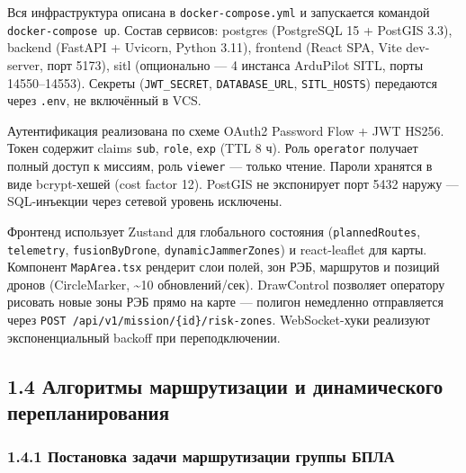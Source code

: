 \documentclass[14pt,a4paper]{extarticle}
\begin{document}
Вся инфраструктура описана в \texttt{docker-compose.yml} и запускается командой \texttt{docker-compose\ up}. Состав сервисов: postgres (PostgreSQL 15 + PostGIS 3.3), backend (FastAPI + Uvicorn, Python 3.11), frontend (React SPA, Vite dev-server, порт 5173), sitl (опционально --- 4 инстанса ArduPilot SITL, порты 14550--14553). Секреты (\texttt{JWT\_SECRET}, \texttt{DATABASE\_URL}, \texttt{SITL\_HOSTS}) передаются через \texttt{.env}, не включённый в VCS.

Аутентификация реализована по схеме OAuth2 Password Flow + JWT HS256. Токен содержит claims \texttt{sub}, \texttt{role}, \texttt{exp} (TTL 8 ч). Роль \texttt{operator} получает полный доступ к миссиям, роль \texttt{viewer} --- только чтение. Пароли хранятся в виде bcrypt-хешей (cost factor 12). PostGIS не экспонирует порт 5432 наружу --- SQL-инъекции через сетевой уровень исключены.

Фронтенд использует Zustand для глобального состояния (\texttt{plannedRoutes}, \texttt{telemetry}, \texttt{fusionByDrone}, \texttt{dynamicJammerZones}) и react-leaflet для карты. Компонент \texttt{MapArea.tsx} рендерит слои полей, зон РЭБ, маршрутов и позиций дронов (CircleMarker, \textasciitilde10 обновлений/сек). DrawControl позволяет оператору рисовать новые зоны РЭБ прямо на карте --- полигон немедленно отправляется через \texttt{POST\ /api/v1/mission/\{id\}/risk-zones}. WebSocket-хуки реализуют экспоненциальный backoff при переподключении.


\hypertarget{ux430ux43bux433ux43eux440ux438ux442ux43cux44b-ux43cux430ux440ux448ux440ux443ux442ux438ux437ux430ux446ux438ux438-ux438-ux434ux438ux43dux430ux43cux438ux447ux435ux441ux43aux43eux433ux43e-ux43fux435ux440ux435ux43fux43bux430ux43dux438ux440ux43eux432ux430ux43dux438ux44f}{%
\subsection{1.4 Алгоритмы маршрутизации и динамического перепланирования}\label{ux430ux43bux433ux43eux440ux438ux442ux43cux44b-ux43cux430ux440ux448ux440ux443ux442ux438ux437ux430ux446ux438ux438-ux438-ux434ux438ux43dux430ux43cux438ux447ux435ux441ux43aux43eux433ux43e-ux43fux435ux440ux435ux43fux43bux430ux43dux438ux440ux43eux432ux430ux43dux438ux44f}}

\hypertarget{ux43fux43eux441ux442ux430ux43dux43eux432ux43aux430-ux437ux430ux434ux430ux447ux438-ux43cux430ux440ux448ux440ux443ux442ux438ux437ux430ux446ux438ux438-ux433ux440ux443ux43fux43fux44b-ux431ux43fux43bux430}{%
\subsubsection{1.4.1 Постановка задачи маршрутизации группы БПЛА}\label{ux43fux43eux441ux442ux430ux43dux43eux432ux43aux430-ux437ux430ux434ux430ux447ux438-ux43cux430ux440ux448ux440ux443ux442ux438ux437ux430ux446ux438ux438-ux433ux440ux443ux43fux43fux44b-ux431ux43fux43bux430}}
\end{document}
